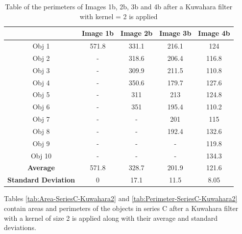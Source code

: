 \documentclass[runningheads]{llncs}
\begin{document}
\begin{table}[h!]
\centering
\begin{tabular}{|c|c|c|c|c|}
\hline
\textbf{} & \textbf{Image 1b} & \textbf{Image 2b} & \textbf{Image 3b} & \textbf{Image 4b} \\
\hline
Obj 1 & 571.8      & 331.1  & 216.1 &  124 \\ \hline
Obj 2 &  -          & 318.6  & 206.4 & 116.8\\ \hline
Obj 3 &   -         & 309.9 & 211.5 &  110.8\\ \hline
Obj 4 &   -         & 350.6  & 179.7 &  127.6\\ \hline
Obj 5 &   -         & 311 &  213 &  124.8\\ \hline
Obj 6 &   -         & 351  & 195.4 &  110.2\\ \hline
Obj 7 &   -         &  -     & 201 &  115\\ \hline
Obj 8 &   -         &  -     & 192.4 &  132.6 \\ \hline
Obj 9 &    -        &  -     &  -    & 119.8\\ \hline
Obj 10 &  -          &  -     &  -    & 134.3\\ \hline
\textbf{Average} &   571.8  &  328.7   &   201.9   & 121.6  \\ \hline
\textbf{Standard Deviation} &  0      &  17.1      &    11.5  & 8.05 \\ \hline
\end{tabular}
\caption{Table of the perimeters of Images 1b, 2b, 3b and 4b after a Kuwahara filter with kernel = 2 is applied}
\label{tab:Perimeter-SeriesB-Kuwahara2}
\end{table}

\newpage
Tables \ref{tab:Area-SeriesC-Kuwahara2} and \ref{tab:Perimeter-SeriesC-Kuwahara2} contain areas and perimeters of the objects in series C after a Kuwahara filter with a kernel of size 2 is applied along with their average and standard deviations.
\end{document}
